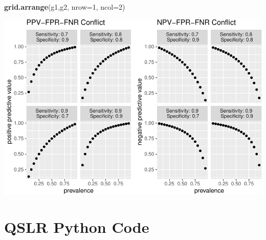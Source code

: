 \documentclass[12pt, twoside]{amherstthesis}
\newenvironment{Shaded}{\begin{snugshade}}{\end{snugshade}}
\newcommand{\AttributeTok}[1]{\textcolor[rgb]{0.13,0.29,0.53}{#1}}
\newcommand{\DecValTok}[1]{\textcolor[rgb]{0.00,0.00,0.81}{#1}}
\newcommand{\FunctionTok}[1]{\textcolor[rgb]{0.13,0.29,0.53}{\textbf{#1}}}
\newcommand{\NormalTok}[1]{#1}
\begin{document}
\begin{Shaded}
\begin{Highlighting}[]
\FunctionTok{grid.arrange}\NormalTok{(g1,g2, }\AttributeTok{nrow=}\DecValTok{1}\NormalTok{, }\AttributeTok{ncol=}\DecValTok{2}\NormalTok{)}
\end{Highlighting}
\end{Shaded}
\begin{center}\includegraphics{Dasha-Asienga_StatThesis_files/figure-latex/unnamed-chunk-44-1} \end{center}

\hypertarget{appendix-b}{%
\chapter{QSLR Python Code}\label{appendix-b}}
\end{document}
